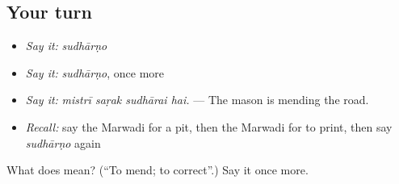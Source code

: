 \subsection*{Your turn}
\begin{itemize}
\raggedright
  \item \emph{Say it:} \emph{sudhārṇo}
  \item \emph{Say it:} \emph{sudhārṇo}, once more
  \item \emph{Say it:} \emph{mistrī saṛak sudhārai hai.} — The mason is mending the road.
  \item \emph{Recall:} say the Marwadi for a pit, then the Marwadi for to print, then say \emph{sudhārṇo} again
\end{itemize}

\begin{tcolorbox}[breakable,colback=teal!4,colframe=teal!35!black,title={Before you move on}]
What does  mean? (\textquotedblleft{}To mend; to correct\textquotedblright{}.) Say it once more.
\end{tcolorbox}
